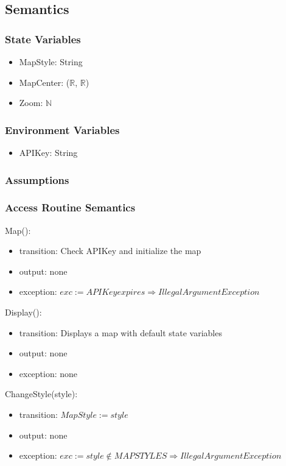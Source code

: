 \documentclass[12pt, titlepage]{article}
\begin{document}
\subsection{Semantics}

\subsubsection{State Variables}

\begin{itemize}
\item MapStyle: String
\item MapCenter: ($\mathbb{R}$, $\mathbb{R}$)
\item Zoom: $\mathbb{N}$
\end{itemize}

\subsubsection{Environment Variables}

\begin{itemize}
\item APIKey: String
\end{itemize}

\subsubsection{Assumptions}

\subsubsection{Access Routine Semantics}

\noindent Map():
\begin{itemize}
\item transition: Check APIKey and initialize the map
\item output: none
\item exception: $exc := APIKey expires \Rightarrow IllegalArgument Exception$
\end{itemize}

\noindent Display():
\begin{itemize}
\item transition: Displays a map with default state variables
\item output: none
\item exception: none
\end{itemize}

\noindent ChangeStyle(style):
\begin{itemize}
\item transition: $MapStyle := style$
\item output: none
\item exception: $exc := style \notin MAPSTYLES \Rightarrow IllegalArgument Exception$
\end{itemize}
\end{document}
